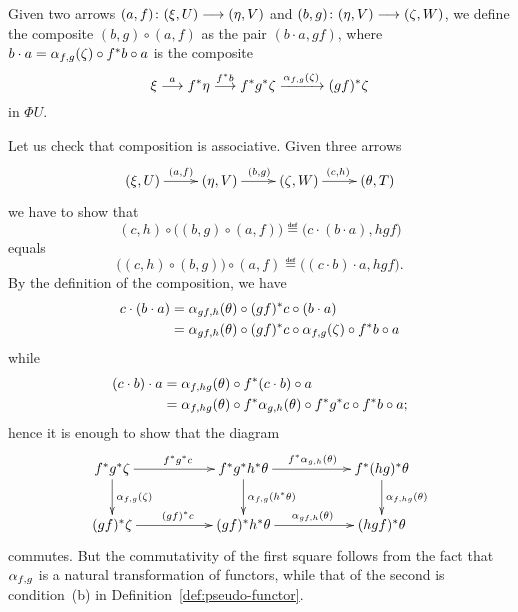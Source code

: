 \begin{3   FIBERED CATEGORIES}
\begin{3.1 Fibered categories}
Given two arrows $(a, f) \colon (\xi, U) \arr (\eta, V)$ and $(b, g) \colon (\eta, V) \arr (\zeta, W)$, we define  the composite $(b,g) \circ (a,f)$ as the pair $(b \cdot a, gf)$, where $b \cdot a = \alpha_{f,g}(\zeta) \circ f^* b \circ a$ is the composite
   \[
   \xi \overset a {\longrightarrow} f^* \eta
   \overset{f^* b} {\longrightarrow} f^*g^* \zeta
   \xrightarrow{\alpha_{f,g}(\zeta)} (gf)^* \zeta
   \]
in $\Phi U$.

Let us check that composition is associative. Given three arrows
   \[
   \xymatrix{
   (\xi, U)\ar[r]^{(a, f)}
   & (\eta, V)\ar[r]^{(b,g)}
   &(\zeta, W)\ar[r]^{(c, h)}
   &(\theta, T)
   }
   \]
we have to show that
   \[
   (c,h) \circ \bigl((b,g) \circ (a,f)\bigr)
   \eqdef \bigl(c \cdot (b \cdot a), hgf\bigr)
   \]
equals
   \[
   \bigl((c,h) \circ (b,g)\bigr) \circ (a,f) \eqdef
   \bigl((c \cdot b) \cdot a, hgf\bigr).
   \]
By the definition of the composition,  we have
   \begin{align*}
   c \cdot (b \cdot a) &=
   \alpha_{gf,h} (\theta) \circ (gf)^* c \circ (b \cdot a)\\
   & =  \alpha_{gf,h} (\theta) \circ (gf)^* c \circ 
   \alpha_{f,g}(\zeta) \circ f^* b \circ a
   \end{align*}
while
   \begin{align*}
   (c \cdot b) \cdot a &=
   \alpha_{f,hg}(\theta) \circ f^*(c \cdot b) \circ a\\
   & =  \alpha_{f,hg} (\theta) \circ f^*\alpha_{g,h}(\theta) \circ
   f^*g^*c \circ f^*b \circ a;
   \end{align*}
hence it is enough to show that the diagram
   \[
   \xymatrix@C+30pt{
   f^*g^* \zeta \ar[r]^{f^*g^*c} \ar[d]^{\isoass_{f,g}(\zeta)}&
   f^*g^*h^*\theta \ar[r]^{f^*\isoass_{g,h}(\theta)}
   \ar[d]^{\isoass_{f,g}(h^{*}\theta)} &
   f^*(hg)^* \theta\ar[d]^{\isoass_{f,hg}(\theta)} \\
   (gf)^*\zeta \ar[r]^{(gf)^*c} &
   (gf)^*h^*\theta \ar[r]^{\isoass_{gf,h}(\theta)} &
   (hgf)^*\theta
   }
   \]
commutes. But the commutativity of the first square follows from the fact that $\alpha_{f,g}$ is a natural transformation of functors, while that of the second is condition~(b) in Definition~\ref{def:pseudo-functor}.


\end{3.1 Fibered categories}
\end{3   FIBERED CATEGORIES}
